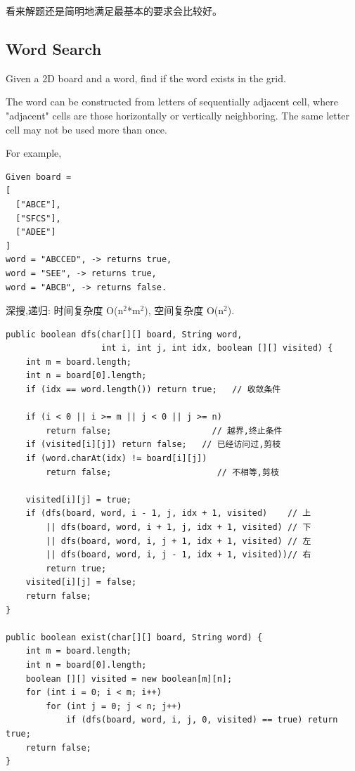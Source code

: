 \documentclass[12pt]{book}
\begin{document}
看来解题还是简明地满足最基本的要求会比较好。

\subsection{Word Search}
\label{sec-11-2-4}
Given a 2D board and a word, find if the word exists in the grid.

The word can be constructed from letters of sequentially adjacent cell, where "adjacent" cells are those horizontally or vertically neighboring. The same letter cell may not be used more than once.

For example,
\lstset{language=java,label= ,caption= ,numbers=none}
\begin{lstlisting}
Given board =
[
  ["ABCE"],
  ["SFCS"],
  ["ADEE"]
]
word = "ABCCED", -> returns true,
word = "SEE", -> returns true,
word = "ABCB", -> returns false.
\end{lstlisting}

深搜,递归: 时间复杂度 O(n$^{\text{2}}$*m$^{\text{2}}$), 空间复杂度 O(n$^{\text{2}}$). 

\lstset{language=java,label= ,caption= ,numbers=none}
\begin{lstlisting}
public boolean dfs(char[][] board, String word,
                   int i, int j, int idx, boolean [][] visited) {
    int m = board.length;
    int n = board[0].length;
    if (idx == word.length()) return true;   // 收敛条件
            
    if (i < 0 || i >= m || j < 0 || j >= n)
        return false;                    // 越界,终止条件
    if (visited[i][j]) return false;   // 已经访问过,剪枝
    if (word.charAt(idx) != board[i][j])
        return false;                     // 不相等,剪枝

    visited[i][j] = true;
    if (dfs(board, word, i - 1, j, idx + 1, visited)    // 上
        || dfs(board, word, i + 1, j, idx + 1, visited) // 下
        || dfs(board, word, i, j + 1, idx + 1, visited) // 左
        || dfs(board, word, i, j - 1, idx + 1, visited))// 右
        return true;
    visited[i][j] = false;
    return false;
}
        
public boolean exist(char[][] board, String word) {
    int m = board.length;
    int n = board[0].length;
    boolean [][] visited = new boolean[m][n];
    for (int i = 0; i < m; i++) 
        for (int j = 0; j < n; j++) 
            if (dfs(board, word, i, j, 0, visited) == true) return true;
    return false;
}
\end{lstlisting}
\end{document}
